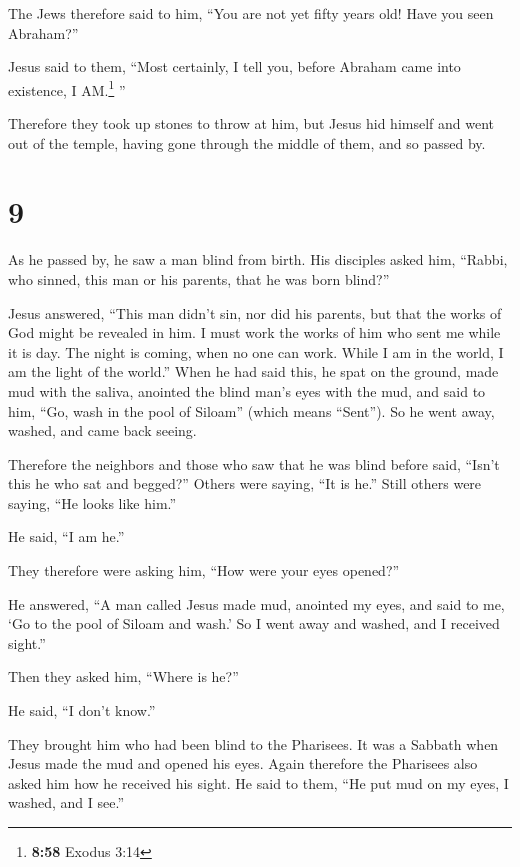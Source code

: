  The Jews therefore said to him, ``You are not yet fifty
years old! Have you seen Abraham?''

 Jesus said to them, ``Most certainly, I tell you, before
Abraham came into existence, I AM.\footnote{\textbf{8:58} Exodus 3:14}
''

 Therefore they took up stones to throw at him, but Jesus
hid himself and went out of the temple, having gone through the middle
of them, and so passed by.

\hypertarget{section-8}{%
\section{9}\label{section-8}}

 As he passed by, he saw a man blind from birth.
 His disciples asked him, ``Rabbi, who sinned, this man or
his parents, that he was born blind?''

 Jesus answered, ``This man didn't sin, nor did his
parents, but that the works of God might be revealed in him.
 I must work the works of him who sent me while it is day.
The night is coming, when no one can work.  While I am in
the world, I am the light of the world.''  When he had
said this, he spat on the ground, made mud with the saliva, anointed the
blind man's eyes with the mud,  and said to him, ``Go,
wash in the pool of Siloam'' (which means ``Sent''). So he went away,
washed, and came back seeing.

 Therefore the neighbors and those who saw that he was
blind before said, ``Isn't this he who sat and begged?'' 
Others were saying, ``It is he.'' Still others were saying, ``He looks
like him.''

He said, ``I am he.''

 They therefore were asking him, ``How were your eyes
opened?''

 He answered, ``A man called Jesus made mud, anointed my
eyes, and said to me, `Go to the pool of Siloam and wash.' So I went
away and washed, and I received sight.''

 Then they asked him, ``Where is he?''

He said, ``I don't know.''

 They brought him who had been blind to the Pharisees.
 It was a Sabbath when Jesus made the mud and opened his
eyes.  Again therefore the Pharisees also asked him how
he received his sight. He said to them, ``He put mud on my eyes, I
washed, and I see.''

